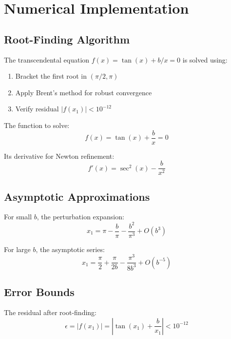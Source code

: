 \documentclass[11pt,a4paper]{article}
\theoremstyle{definition}
\theoremstyle{plain}
\theoremstyle{remark}
\begin{document}
\section{Numerical Implementation}
\label{app:numerical}

\subsection{Root-Finding Algorithm}

The transcendental equation $f(x) = \tan(x) + b/x = 0$ is solved using:
\begin{enumerate}
\item Bracket the first root in $(\pi/2, \pi)$
\item Apply Brent's method for robust convergence
\item Verify residual $|f(x_1)| < 10^{-12}$
\end{enumerate}

The function to solve:
\begin{equation}
f(x) = \tan(x) + \frac{b}{x} = 0
\label{eq:app-f-def}
\end{equation}

Its derivative for Newton refinement:
\begin{equation}
f'(x) = \sec^2(x) - \frac{b}{x^2}
\label{eq:app-f-deriv}
\end{equation}

\subsection{Asymptotic Approximations}

For small $b$, the perturbation expansion:
\begin{equation}
x_1 = \pi - \frac{b}{\pi} - \frac{b^2}{\pi^3} + O(b^3)
\label{eq:app-small-b}
\end{equation}

For large $b$, the asymptotic series:
\begin{equation}
x_1 = \frac{\pi}{2} + \frac{\pi}{2b} - \frac{\pi^3}{8b^3} + O(b^{-5})
\label{eq:app-large-b}
\end{equation}

\subsection{Error Bounds}

The residual after root-finding:
\begin{equation}
\epsilon = |f(x_1)| = \left|\tan(x_1) + \frac{b}{x_1}\right| < 10^{-12}
\label{eq:app-residual}
\end{equation}
\end{document}
